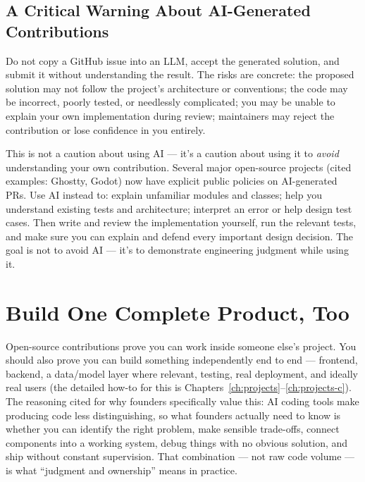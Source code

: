 \subsection{A Critical Warning About AI-Generated Contributions}

Do not copy a GitHub issue into an LLM, accept the generated solution, and submit it without understanding the
result. The risks are concrete: the proposed solution may not follow the project's architecture or conventions;
the code may be incorrect, poorly tested, or needlessly complicated; you may be unable to explain your own
implementation during review; maintainers may reject the contribution or lose confidence in you entirely.

\begin{caution}
This is not a caution about using AI --- it's a caution about using it to \emph{avoid} understanding your own
contribution. Several major open-source projects (cited examples: Ghostty, Godot) now have explicit public
policies on AI-generated PRs. Use AI instead to: explain unfamiliar modules and classes; help you understand
existing tests and architecture; interpret an error or help design test cases. Then write and review the
implementation yourself, run the relevant tests, and make sure you can explain and defend every important design
decision. The goal is not to avoid AI — it's to demonstrate engineering judgment while using it.
\end{caution}

\section{Build One Complete Product, Too}

Open-source contributions prove you can work inside someone else's project. You should also prove you can build
something independently end to end — frontend, backend, a data/model layer where relevant, testing, real
deployment, and ideally real users (the detailed how-to for this is Chapters~\ref{ch:projects}--\ref{ch:projects-c}).
The reasoning cited for why founders specifically value this: AI coding tools make producing code less
distinguishing, so what founders actually need to know is whether you can identify the right problem, make
sensible trade-offs, connect components into a working system, debug things with no obvious solution, and ship
without constant supervision. That combination — not raw code volume — is what ``judgment and ownership'' means
in practice.

